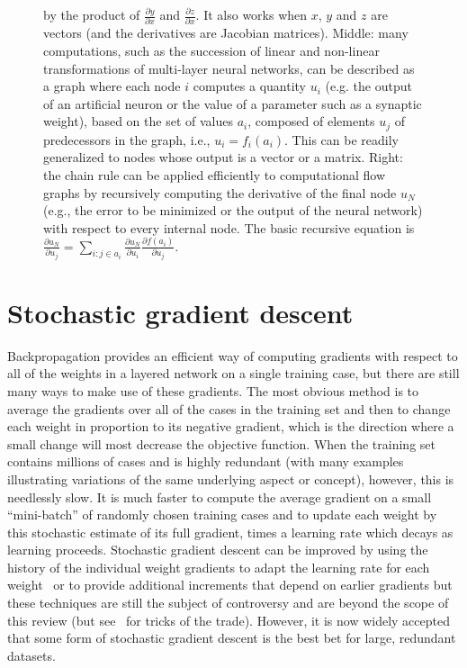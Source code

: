 \documentclass[10pts]{article}
\begin{document}
\begin{figure}[htp]
{\begin{minipage}{\textwidth}
{by the product of $\frac{\partial y}{\partial x}$ and
$\frac{\partial z}{\partial x}$. It also works when $x$, $y$
and $z$ are vectors (and the derivatives are Jacobian matrices). \newline
Middle: many computations, such as the succession of linear and non-linear 
transformations of multi-layer neural networks, can be described as
a graph where each node $i$ computes a quantity $u_i$ (e.g. the
output of an artificial neuron or the value of a parameter such as
a synaptic weight), based on the set of values $a_i$, composed of elements $u_j$ of
predecessors in the graph, i.e., $u_i = f_i(a_i)$. This can be readily
generalized to nodes whose output is a vector or a matrix.\newline
Right: the chain rule can be applied efficiently to computational
flow graphs by recursively computing the derivative of the final
node $u_N$ (e.g., the error to be minimized or the output of the neural network)
with respect to every internal node. The basic recursive equation
is
$\frac{\partial u_N}{\partial u_j} = \sum_{i: j \in a_i} \frac{\partial u_N}{\partial u_i}
\frac{\partial f(a_i)}{\partial u_j}.$
}
\label{fig:backprop-box}
\end{minipage}
}
\end{figure}


\section{Stochastic gradient descent}

Backpropagation provides an efficient way of computing gradients with respect to all of
the weights in a layered network on a single training case, but there are
still many ways to make use of these gradients. The most obvious method is
to average the gradients over all of the cases in the training set and then
to change each weight in proportion to its negative gradient, which is the
direction where a small change will most decrease the objective function. 
When the training set contains millions of cases and is highly redundant
(with many examples illustrating variations of the same underlying 
aspect or concept), however,
this is needlessly slow. It is much faster to compute the average gradient
on a small ``mini-batch'' of randomly chosen training cases and to update
each weight by this stochastic estimate of its full gradient, times a
learning rate which decays as learning proceeds. Stochastic gradient
descent can be improved by using the history of the individual weight
gradients to adapt the learning rate for each weight~\citep{bottou-bousquet-2008-small}
or to provide additional increments that depend on earlier gradients 
but these techniques are still the subject of controversy and are beyond
the scope of this review (but see~\citet{Montavon2012} for tricks of the trade). 
However, it is now widely accepted that some
form of stochastic gradient descent is the best bet for large, redundant
datasets.
\end{document}
